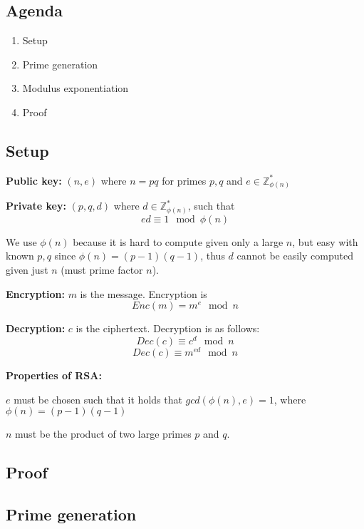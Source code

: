 

\subsection*{Agenda}
\begin{enumerate}
\item Setup
\item Prime generation
\item Modulus exponentiation
\item Proof
\end{enumerate}

\subsection{Setup}
\textbf{Public key:} $(n, e)$ where $n = pq$ for primes $p, q$ and $e \in \mathbb{Z}_{\phi(n)}^*$

\textbf{Private key:} $(p, q, d)$ where $d \in \mathbb{Z}_{\phi(n)}^*$, such that
\[ ed \equiv 1 \mod \phi(n) \]

We use $\phi(n)$ because it is hard to compute given only a large $n$, but easy with known $p, q$ since $\phi(n) = (p-1)(q-1)$, thus $d$ cannot be easily computed given just $n$ (must prime factor $n$).

\textbf{Encryption:} $m$ is the message. Encryption is
\[ Enc(m) = m^e \mod n \]

\textbf{Decryption:} $c$ is the ciphertext. Decryption is as follows:
\[ Dec(c) \equiv c^d \mod n \]
\[ Dec(c) \equiv m^{ed} \mod n \]

\textbf{Properties of RSA:}

$e$ must be chosen such that it holds that $gcd(\phi(n),e) = 1$, where
$\phi(n) = (p - 1)(q - 1)$

$n$ must be the product of two large primes $p$ and $q$.

\subsection{Proof}


\subsection{Prime generation}
